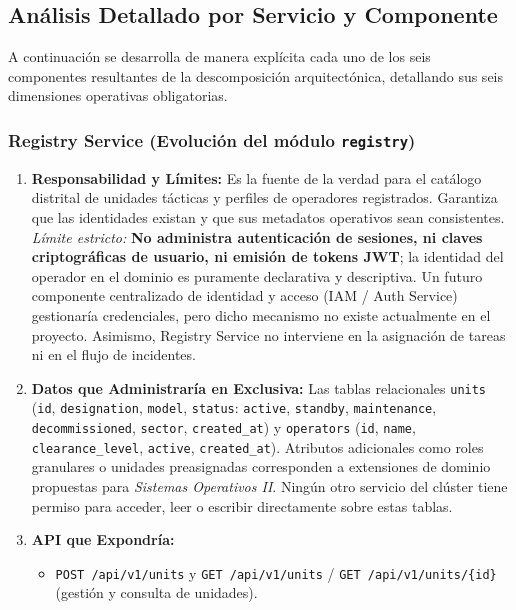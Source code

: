 \documentclass[10pt,a4paper]{article}
\begin{document}
\subsection{Análisis Detallado por Servicio y Componente}

A continuación se desarrolla de manera explícita cada uno de los seis componentes resultantes de la descomposición arquitectónica, detallando sus seis dimensiones operativas obligatorias.

\subsubsection{Registry Service (Evolución del módulo \texttt{registry})}

\begin{enumerate}[leftmargin=*]
    \item \textbf{Responsabilidad y Límites:} Es la fuente de la verdad para el catálogo distrital de unidades tácticas y perfiles de operadores registrados. Garantiza que las identidades existan y que sus metadatos operativos sean consistentes. \textit{Límite estricto:} \textbf{No administra autenticación de sesiones, ni claves criptográficas de usuario, ni emisión de tokens JWT}; la identidad del operador en el dominio es puramente declarativa y descriptiva. Un futuro componente centralizado de identidad y acceso (IAM / Auth Service) gestionaría credenciales, pero dicho mecanismo no existe actualmente en el proyecto. Asimismo, Registry Service no interviene en la asignación de tareas ni en el flujo de incidentes.
    \item \textbf{Datos que Administraría en Exclusiva:} Las tablas relacionales \texttt{units} (\texttt{id}, \texttt{designation}, \texttt{model}, \texttt{status}: \texttt{active}, \texttt{standby}, \texttt{maintenance}, \texttt{decommissioned}, \texttt{sector}, \texttt{created\_at}) y \texttt{operators} (\texttt{id}, \texttt{name}, \texttt{clearance\_level}, \texttt{active}, \texttt{created\_at}). Atributos adicionales como roles granulares o unidades preasignadas corresponden a extensiones de dominio propuestas para \textit{Sistemas Operativos II}. Ningún otro servicio del clúster tiene permiso para acceder, leer o escribir directamente sobre estas tablas.
    \item \textbf{API que Expondría:}
    \begin{itemize}[leftmargin=*]
        \item \texttt{POST /api/v1/units} y \texttt{GET /api/v1/units} / \texttt{GET /api/v1/units/\{id\}} (gestión y consulta de unidades).

\end{itemize}
\end{enumerate}
\end{document}
